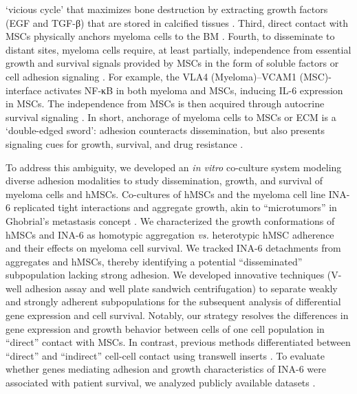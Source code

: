 ‘vicious cycle’ that maximizes bone destruction by extracting growth factors
(EGF and TGF-β) that are stored in calcified tissues
\cite{glaveyProteomicCharacterizationHuman2017}. Third, direct contact with MSCs
physically anchors myeloma cells to the BM
\cite{zeissigTumourDisseminationMultiple2020,sanz-rodriguezCharacterizationVLA4dependentMyeloma1999}.
Fourth, to disseminate to distant sites, myeloma cells require, at least
partially, independence from essential growth and survival signals provided by
MSCs in the form of soluble factors or cell adhesion signaling
\cite{garcia-ortizRoleTumorMicroenvironment2021, chatterjeePresenceBoneMarrow2002,hideshimaUnderstandingMultipleMyeloma2007}.
For example, the VLA4 (Myeloma)–VCAM1 (MSC)-interface activates NF-κB in both
myeloma and MSCs, inducing IL-6 expression in MSCs. The independence from MSCs
is then acquired through autocrine survival signaling
\cite{frassanitoAutocrineInterleukin6Production2001, urashimaCD40LigandTriggered1995}.
In short, anchorage of myeloma cells to MSCs or ECM is a ‘double-edged sword’:
adhesion counteracts dissemination, but also presents signaling cues for growth,
survival, and drug resistance \cite{solimandoDrugResistanceMultiple2022}.


To address this ambiguity, we developed an \textit{in vitro} co-culture system
modeling diverse adhesion modalities to study dissemination, growth, and
survival of myeloma cells and hMSCs. Co-cultures of hMSCs and the myeloma cell
line INA-6 replicated tight interactions and aggregate growth, akin to
``microtumors'' in Ghobrial’s metastasis concept
\cite{ghobrialMyelomaModelProcess2012}. We characterized the growth
conformations of hMSCs and INA-6 as homotypic aggregation \textit{vs.}
heterotypic hMSC adherence and their effects on myeloma cell survival. We
tracked INA-6 detachments from aggregates and hMSCs, thereby identifying a
potential ``disseminated'' subpopulation lacking strong adhesion. We developed
innovative techniques (V-well adhesion assay and well plate sandwich
centrifugation) to separate weakly and strongly adherent subpopulations for the
subsequent analysis of differential gene expression and cell survival. Notably,
our strategy resolves the differences in gene expression and growth behavior
between cells of one cell population in ``direct'' contact with MSCs. In
contrast, previous methods differentiated between ``direct'' and ``indirect''
cell-cell contact using transwell inserts
\cite{dziadowiczBoneMarrowStromaInduced2022}. To evaluate whether genes
mediating adhesion and growth characteristics of INA-6 were associated with
patient survival, we analyzed publicly available datasets
\cite{seckingerTargetExpressionGeneration2017b,seckingerCD38ImmunotherapeuticTarget2018}.


